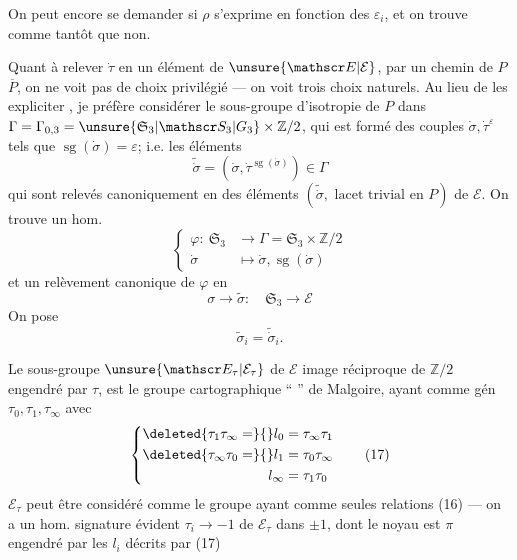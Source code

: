On peut encore se demander si $\rho$ s'exprime en fonction des $\varepsilon_i$, et on trouve comme tantôt que non.

Quant à relever $\dot\tau$ en un élément de $\unsure{\mathscr E|\mathcal E}$, par un chemin de $P$  $\overline P$, on ne voit pas de choix privilégié --- on voit trois choix  naturels. Au lieu de les expliciter , je préfère considérer le sous-groupe d'isotropie de $P$ dans $\Gamma=\Gamma_{0,3}=\unsure{\mathfrak S_3|\mathscr S_3|G_3}\times\mathbb Z/2$, qui est formé des couples $\dot\sigma,\dot\tau^{\varepsilon}$ tels que $\operatorname{sg}(\dot\sigma)=\varepsilon$;  i.e. les éléments
\[
\widetilde{\dot\sigma}=(\dot\sigma,\dot\tau^{\operatorname{sg}(\dot\sigma)})\in\Gamma
\]
qui sont relevés canoniquement en des éléments $(\widetilde{\dot\sigma},\text{ lacet trivial en }P)$ de $\mathscr E$. On trouve un hom.
\[
\left\{\begin{aligned}
\varphi:\ \mathfrak S_3&\longrightarrow\Gamma=\mathfrak S_3\times\mathbb Z/2\\
\dot\sigma&\longmapsto\dot\sigma,\operatorname{sg}(\dot\sigma)
\end{aligned}\right.\tag*{(11)}
\]
et un relèvement canonique de $\varphi$ en
\[
\sigma\longrightarrow\widetilde\sigma:\quad\mathfrak S_3\longrightarrow\mathscr E\tag*{(12)}
\]
On pose
\[
\widetilde\sigma_i=\widetilde{\dot\sigma}_i.
\]

Le sous-groupe $\unsure{\mathscr E_\tau|\mathcal E_\tau}$ de $\mathscr E$ image réciproque de $\mathbb Z/2$ engendré par $\tau$, est le groupe cartographique `` '' de Malgoire, ayant comme gén $\tau_0,\tau_1,\tau_\infty$  avec
\[
\left\{\begin{aligned}
\deleted{\tau_1\tau_\infty=}{ }l_0&=\tau_\infty\tau_1\\
\deleted{\tau_\infty\tau_0=}{ }l_1&=\tau_0\tau_\infty\\
l_\infty&=\tau_1\tau_0
\end{aligned}\right.\tag*{(17)}
\]
$\mathscr E_\tau$ peut être considéré comme le groupe ayant comme  seules relations (16) --- on a un hom. signature évident $\tau_i\to-1$ de $\mathscr E_\tau$ dans $\pm1$, dont le noyau est $\pi$ engendré par les $l_i$ décrits par (17)

